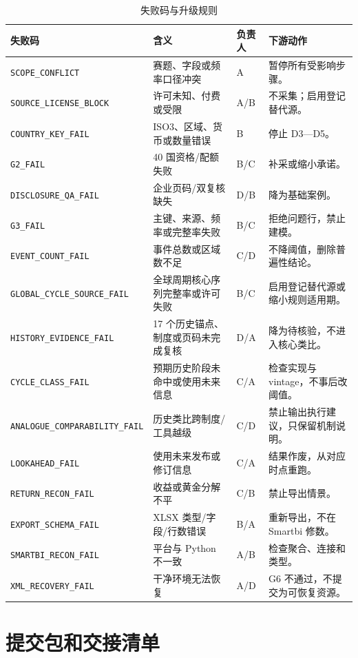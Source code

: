 \documentclass[UTF8,fontset=windows,12pt,openany]{ctexbook}
\newcommand{\Field}[1]{{\small\nolinkurl{#1}}}
\begin{document}
\begin{longtable}{p{3.0cm}p{4.1cm}p{3.2cm}p{3.8cm}}
\caption{失败码与升级规则}\label{tab:failure-codes}\\
\toprule
\textbf{失败码} & \textbf{含义} & \textbf{负责人} & \textbf{下游动作}\\
\midrule
\Field{SCOPE_CONFLICT} & 赛题、字段或频率口径冲突 & A & 暂停所有受影响步骤。\\
\Field{SOURCE_LICENSE_BLOCK} & 许可未知、付费或受限 & A/B & 不采集；启用登记替代源。\\
\Field{COUNTRY_KEY_FAIL} & ISO3、区域、货币或数量错误 & B & 停止 D3—D5。\\
\Field{G2_FAIL} & 40 国资格/配额失败 & B/C & 补采或缩小承诺。\\
\Field{DISCLOSURE_QA_FAIL} & 企业页码/双复核缺失 & D/B & 降为基础案例。\\
\Field{G3_FAIL} & 主键、来源、频率或完整率失败 & B/C & 拒绝问题行，禁止建模。\\
\Field{EVENT_COUNT_FAIL} & 事件总数或区域数不足 & C/D & 不降阈值，删除普遍性结论。\\
\Field{GLOBAL_CYCLE_SOURCE_FAIL} & 全球周期核心序列完整率或许可失败 & B/C & 启用登记替代源或缩小规则适用期。\\
\Field{HISTORY_EVIDENCE_FAIL} & 17 个历史锚点、制度或页码未完成复核 & D/A & 降为待核验，不进入核心类比。\\
\Field{CYCLE_CLASS_FAIL} & 预期历史阶段未命中或使用未来信息 & C/A & 检查实现与 vintage，不事后改阈值。\\
\Field{ANALOGUE_COMPARABILITY_FAIL} & 历史类比跨制度/工具越级 & C/D & 禁止输出执行建议，只保留机制说明。\\
\Field{LOOKAHEAD_FAIL} & 使用未来发布或修订信息 & C/A & 结果作废，从对应时点重跑。\\
\Field{RETURN_RECON_FAIL} & 收益或黄金分解不平 & C/B & 禁止导出情景。\\
\Field{EXPORT_SCHEMA_FAIL} & XLSX 类型/字段/行数错误 & B/A & 重新导出，不在 Smartbi 修数。\\
\Field{SMARTBI_RECON_FAIL} & 平台与 Python 不一致 & A/B & 检查聚合、连接和类型。\\
\Field{XML_RECOVERY_FAIL} & 干净环境无法恢复 & A/D & G6 不通过，不提交为可恢复资源。\\
\bottomrule
\end{longtable}

\chapter{提交包和交接清单}
\end{document}
